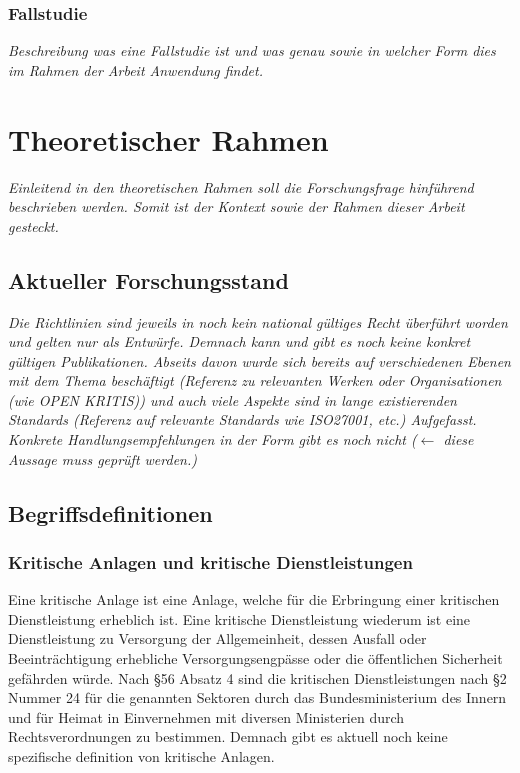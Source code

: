 \documentclass[11pt,a4paper]{article}   %
\begin{document}
            \subsubsection{Fallstudie}
                \emph{Beschreibung was eine Fallstudie ist und was genau sowie in welcher Form dies im Rahmen der Arbeit Anwendung findet.}

    
    \newpage
    \section{Theoretischer Rahmen}
        \emph{Einleitend in den theoretischen Rahmen soll die Forschungsfrage hinführend beschrieben werden. Somit ist der Kontext sowie der Rahmen dieser Arbeit gesteckt.}
        \subsection{Aktueller Forschungsstand}
            \emph{Die Richtlinien sind jeweils in noch kein national gültiges Recht überführt worden und gelten nur als Entwürfe. Demnach kann und gibt es noch keine konkret gültigen Publikationen. Abseits davon wurde sich bereits auf verschiedenen Ebenen mit dem Thema beschäftigt (Referenz zu relevanten Werken oder Organisationen (wie OPEN KRITIS)) und auch viele Aspekte sind in lange existierenden Standards (Referenz auf relevante Standards wie ISO27001, etc.) Aufgefasst. Konkrete Handlungsempfehlungen in der Form gibt es noch nicht ($\leftarrow$ diese Aussage muss geprüft werden.)}
        
        \subsection{Begriffsdefinitionen}
            \subsubsection{Kritische Anlagen und kritische Dienstleistungen}
            Eine kritische Anlage ist eine Anlage, welche für die Erbringung einer kritischen Dienstleistung erheblich ist. Eine kritische Dienstleistung wiederum ist eine Dienstleistung zu Versorgung der Allgemeinheit, dessen Ausfall oder Beeinträchtigung erhebliche Versorgungsengpässe oder die öffentlichen Sicherheit gefährden würde. Nach §56 Absatz 4 sind die kritischen Dienstleistungen nach §2 Nummer 24 für die genannten Sektoren durch das Bundesministerium des Innern und für Heimat in Einvernehmen mit diversen Ministerien durch Rechtsverordnungen zu bestimmen. Demnach gibt es aktuell noch keine spezifische definition von kritische Anlagen.
\end{document}
